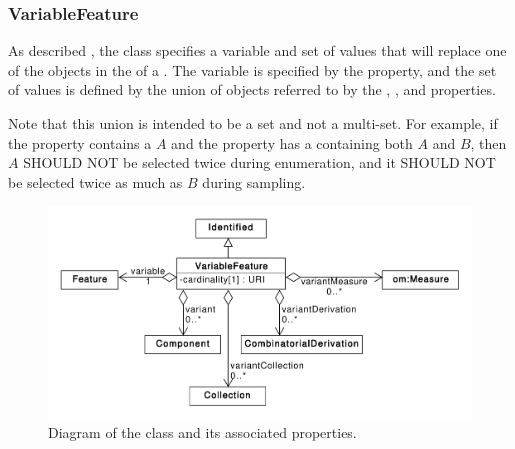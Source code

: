 \subsubsection{VariableFeature}
\label{sec:VariableFeature}

As described , the   class specifies a variable and set of values that will replace one of the   objects in the  of a .
The variable is specified by the  property,
and the set of values is defined by the union of  objects referred to by the , , and  properties.

Note that this union is intended to be a set and not a multi-set.
For example, if the  property contains a  $A$ and the  property has a  containing both  $A$ and   $B$, then $A$ SHOULD NOT be selected twice during enumeration, and it SHOULD NOT be selected twice as much as $B$ during sampling.


\begin{figure}[ht]
\begin{center}
\includegraphics[scale=0.6]{uml/variable_component}
\caption[]{Diagram of the  class and its associated properties.}
\label{uml:variable_component}
\end{center}
\end{figure}

